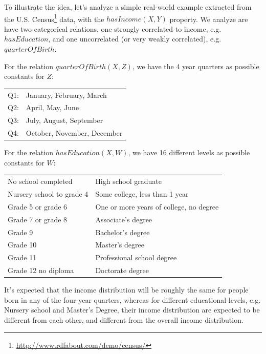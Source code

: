 To illustrate the idea, let's analyze a simple real-world example extracted from the U.S.
Census\footnote{\url{http://www.rdfabout.com/demo/census/}} data, with the $hasIncome(X,Y)$ property. We analyze are
have two categorical relations, one strongly correlated to income, e.g. $hasEducation$, and one uncorrelated (or very
weakly correlated), e.g. $quarterOfBirth$.

For the relation $quarterOfBirth(X,Z)$, we have the 4 year quarters as possible constants for $Z$:

\begin{center}
  \begin{tabular}{r l}
    Q1:& January, February, March \\
    Q2:& April, May, June \\
    Q3:& July, August, September \\
    Q4:& October, November, December \\
  \end{tabular}
\end{center}

For the relation $hasEducation(X,W)$, we have 16 different levels as possible constants for $W$:

\begin{center}
  \begin{tabular}{l l}
    	
    No school completed			&High school graduate                 		\\
    Nursery school to grade 4   	&Some college, less than 1 year			\\
    Grade 5 or grade 6          	&One or more years of college, no degree	\\
    Grade 7 or grade 8          	&Associate's degree				\\
    Grade 9                     	&Bachelor's degree				\\
    Grade 10                    	&Master's degree				\\
    Grade 11                    	&Professional school degree			\\
    Grade 12 no diploma 		&Doctorate degree				\\
  \end{tabular}
\end{center}

It's expected that the income distribution will be roughly the same for people born in any of the four year quarters,
whereas for different educational levels, e.g. Nursery school and Master's Degree, their income distribution are
expected to be different from each other, and different from the overall income distribution. 


